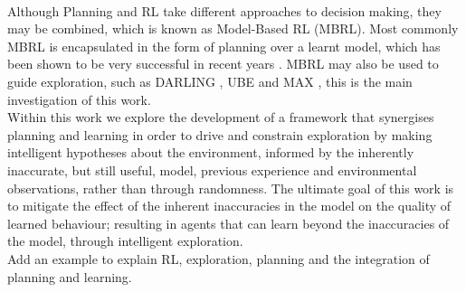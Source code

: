\\Although Planning and RL take different approaches to decision making, they may be combined, which is known as Model-Based RL (MBRL). Most commonly MBRL is encapsulated in the form of planning over a learnt model, which has been shown to be very successful in recent years  \cite{silver2017mastering, pmlr-v28-levine13}. MBRL may also be used to guide exploration, such as DARLING \cite{AIJ16-leonetti}, UBE \cite{DBLP:journals/corr/abs-1709-05380} and MAX \cite{DBLP:journals/corr/abs-1810-12162}, this is the main investigation of this work.
\\Within this work we explore the development of a framework that synergises planning and learning in order to drive and constrain exploration by making intelligent hypotheses about the environment, informed by the inherently inaccurate, but still useful, model, previous experience and environmental observations, rather than through randomness. The ultimate goal of this work is to mitigate the effect of the inherent inaccuracies in the model on the quality of learned behaviour; resulting in agents that can learn beyond the inaccuracies of the model, through intelligent exploration.
\\Add an example to explain RL, exploration, planning and the integration of planning and learning.